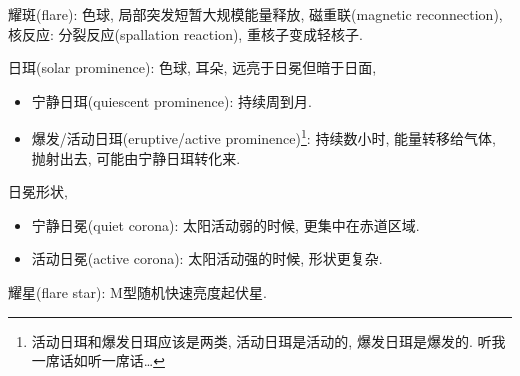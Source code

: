 耀斑(flare): 色球, 局部突发短暂大规模能量释放, 磁重联(magnetic reconnection), 核反应: 分裂反应(spallation reaction), 重核子变成轻核子.

日珥(solar prominence): 色球, 耳朵, 远亮于日冕但暗于日面,
\begin{itemize}
    \item 宁静日珥(quiescent prominence): 持续周到月.
    \item 爆发/活动日珥(eruptive/active prominence)\footnote{活动日珥和爆发日珥应该是两类, 活动日珥是活动的, 爆发日珥是爆发的. 听我一席话如听一席话\dots}: 持续数小时, 能量转移给气体, 抛射出去, 可能由宁静日珥转化来.
\end{itemize}

日冕形状,
\begin{itemize}
    \item 宁静日冕(quiet corona): 太阳活动弱的时候, 更集中在赤道区域.
    \item 活动日冕(active corona): 太阳活动强的时候, 形状更复杂.
\end{itemize}

耀星(flare star): M型随机快速亮度起伏星.
